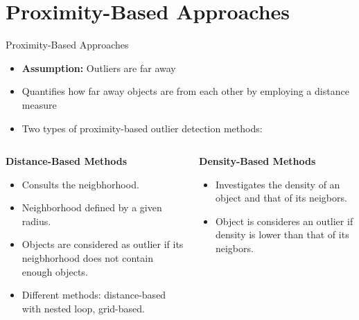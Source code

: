 \section{Proximity-Based Approaches}


\begin{frame}{Proximity-Based Approaches}
	\begin{itemize}
		\item \textbf{Assumption:} Outliers are far away
		\item Quantifies how far away objects are from each other by employing a distance measure
		\item Two types of proximity-based outlier detection methods:
	\end{itemize}

	\begin{columns}
		\begin{column}{0.55\textwidth}
			\begin{center}
				\textbf{Distance-Based Methods}
			\end{center}
			\begin{itemize}
				\item Consults the neigbhorhood.
				\item Neighborhood defined by a given radius.
				\item Objects are considered as outlier if its neigbhorhood does not contain enough objects.
				\item Different methods: distance-based with nested loop, grid-based.
			\end{itemize}
		\end{column}

		\begin{column}{0.45\textwidth}
			\begin{center}
				\textbf{Density-Based Methods}
			\end{center}
			\begin{itemize}
				\item Investigates the density of an object and that of its neigbors.
				\item Object is consideres an outlier if density is lower than that of its neigbors.
			\end{itemize}
		\end{column}
	\end{columns}
\end{frame}


